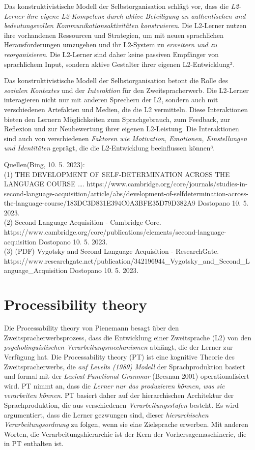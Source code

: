 \documentclass[
  letterpaper,
]{scrbook}
\begin{document}
Das konstruktivistische Modell der Selbstorganisation schlägt vor, dass
die \emph{L2-Lerner ihre eigene L2-Kompetenz durch aktive Beteiligung an
authentischen und bedeutungsvollen Kommunikationsaktivitäten
konstruieren}. Die L2-Lerner nutzen ihre vorhandenen Ressourcen und
Strategien, um mit neuen sprachlichen Herausforderungen umzugehen und
ihr L2-System zu \emph{erweitern und zu reorganisieren}. Die L2-Lerner
sind daher keine passiven Empfänger von sprachlichem Input, sondern
aktive Gestalter ihrer eigenen L2-Entwicklung².

Das konstruktivistische Modell der Selbstorganisation betont die Rolle
des \emph{sozialen Kontextes} und der \emph{Interaktion} für den
Zweitspracherwerb. Die L2-Lerner interagieren nicht nur mit anderen
Sprechern der L2, sondern auch mit verschiedenen Artefakten und Medien,
die die L2 vermitteln. Diese Interaktionen bieten den Lernern
Möglichkeiten zum Sprachgebrauch, zum Feedback, zur Reflexion und zur
Neubewertung ihrer eigenen L2-Leistung. Die Interaktionen sind auch von
verschiedenen \emph{Faktoren wie Motivation, Emotionen, Einstellungen
und Identitäten} geprägt, die die L2-Entwicklung beeinflussen können³.

Quellen(Bing, 10. 5. 2023):\\
(1) THE DEVELOPMENT OF SELF-DETERMINATION ACROSS THE LANGUAGE COURSE
\ldots.
https://www.cambridge.org/core/journals/studies-in-second-language-acquisition/article/abs/development-of-selfdetermination-across-the-language-course/183DC3D831E394C0A3BFE35D79D382A9
Dostopano 10. 5. 2023.\\
(2) Second Language Acquisition - Cambridge Core.
https://www.cambridge.org/core/publications/elements/second-language-acquisition
Dostopano 10. 5. 2023.\\
(3) (PDF) Vygotsky and Second Language Acquisition - ResearchGate.
https://www.researchgate.net/publication/342196944\_Vygotsky\_and\_Second\_Language\_Acquisition
Dostopano 10. 5. 2023.

\hypertarget{processibility-theory}{%
\section{Processibility theory}\label{processibility-theory}}

Die Processability theory von Pienemann besagt über den
Zweitspracherwerbsprozess, dass die Entwicklung einer Zweitsprache (L2)
von den \emph{psycholinguistischen Verarbeitungsmechanismen} abhängt,
die der Lerner zur Verfügung hat. Die Processability theory (PT) ist
eine kognitive Theorie des Zweitspracherwerbs, die \emph{auf Levelts
(1989) Modell} der Sprachproduktion basiert und formal mit der
\emph{Lexical-Functional Grammar} (Bresnan 2001) operationalisiert wird.
PT nimmt an, dass die \emph{Lerner nur das produzieren können, was sie
verarbeiten können}. PT basiert daher auf der hierarchischen Architektur
der Sprachproduktion, die aus verschiedenen \emph{Verarbeitungsstufen}
besteht. Es wird argumentiert, dass die Lerner gezwungen sind, dieser
\emph{hierarchischen Verarbeitungsordnung} zu folgen, wenn sie eine
Zielsprache erwerben. Mit anderen Worten, die Verarbeitungshierarchie
ist der Kern der Vorhersagemaschinerie, die in PT enthalten ist.
\end{document}
